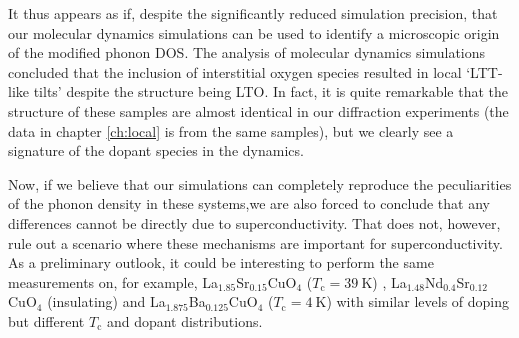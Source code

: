 It thus appears as if, despite the significantly reduced simulation precision, that our molecular dynamics simulations can be used to identify a microscopic origin of the modified phonon DOS. The analysis of molecular dynamics simulations concluded that the inclusion of interstitial oxygen species resulted in local `LTT-like tilts' despite the structure being LTO. In fact, it is quite remarkable that the structure of these samples are almost identical in our diffraction experiments (the data in chapter \ref{ch:local} is from the same samples), but we clearly see a signature of the dopant species in the dynamics. 

Now, if we believe that our simulations can completely reproduce the peculiarities of the phonon density in these systems,we are also forced to conclude that any differences cannot be directly due to superconductivity. That does not, however, rule out a scenario where these mechanisms are important for superconductivity. As a preliminary outlook, it could be interesting to perform the same measurements on, for example, La$_{1.85}$Sr$_{0.15}$CuO$_4$ ($T_\text{c} = \SI{39}{\kelvin}$) \cite{Radaelli1994a}, La$_{1.48}$Nd$_{0.4}$Sr$_{0.12}$CuO$_4$ (insulating) \cite{Tranquada1995} and La$_{1.875}$Ba$_{0.125}$CuO$_4$ ($T_\text{c} = \SI{4}{\kelvin}$) \cite{Hucker2011} with similar levels of doping but different $T_\text{c}$ and dopant distributions.
